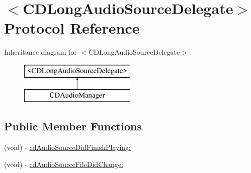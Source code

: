 \hypertarget{protocol_c_d_long_audio_source_delegate-p}{\section{$<$C\-D\-Long\-Audio\-Source\-Delegate$>$ Protocol Reference}
\label{protocol_c_d_long_audio_source_delegate-p}
}
Inheritance diagram for $<$C\-D\-Long\-Audio\-Source\-Delegate$>$\-:\begin{figure}[H]
\begin{center}
\leavevmode
\includegraphics[height=2.000000cm]{protocol_c_d_long_audio_source_delegate-p}
\end{center}
\end{figure}
\subsection*{Public Member Functions}
\begin{DoxyCompactItemize}
\item 
(void) -\/ \hyperlink{protocol_c_d_long_audio_source_delegate-p_a282e78262a9c85259d1f80a66b0652ad}{cd\-Audio\-Source\-Did\-Finish\-Playing\-:}
\item 
(void) -\/ \hyperlink{protocol_c_d_long_audio_source_delegate-p_a18358d9f14b129dda839edb9f37dd3c5}{cd\-Audio\-Source\-File\-Did\-Change\-:}
\end{DoxyCompactItemize}



